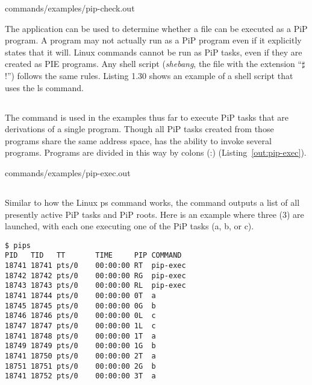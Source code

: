 
                {commands/examples/pip-check.out}

The  application can be used to determine whether a
file can be executed as a PiP program. A program may not actually run
as a PiP program even if it explicitly states that it will. Linux commands
cannot be run as PiP tasks, even if they are created as PIE programs. Any
shell script ({\it shebang}, the file with the extension
``{$\sharp$}!'') follows the same rules. Listing 1.30 shows an example
of a shell script that uses the ls command. 

\subsection{}

The  command is used in the examples thus far to
execute PiP tasks that are derivations of a single program. Though all
PiP tasks created from those programs share the same address space,
 has the ability to invoke several programs. Programs
are divided in this way by colons (:) (Listing~\ref{out:pip-exec}).


                {commands/examples/pip-exec.out}

\subsection{}\label{sec:pips}

Similar to how the Linux ps command works, the  command
outputs a list of all presently active PiP tasks and PiP roots. Here
is an example where three (3)  are launched, with
each one executing one of the PiP tasks (a, b, or c).

\begin{lstlisting}[frame=tRBl]
$ pips
PID   TID   TT       TIME     PIP COMMAND
18741 18741 pts/0    00:00:00 RT  pip-exec
18742 18742 pts/0    00:00:00 RG  pip-exec
18743 18743 pts/0    00:00:00 RL  pip-exec
18741 18744 pts/0    00:00:00 0T  a
18745 18745 pts/0    00:00:00 0G  b
18746 18746 pts/0    00:00:00 0L  c
18747 18747 pts/0    00:00:00 1L  c
18741 18748 pts/0    00:00:00 1T  a
18749 18749 pts/0    00:00:00 1G  b
18741 18750 pts/0    00:00:00 2T  a
18751 18751 pts/0    00:00:00 2G  b
18741 18752 pts/0    00:00:00 3T  a
\end{lstlisting}

